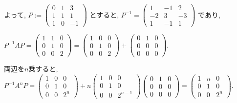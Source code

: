 \documentclass{jsarticle}
\begin{document}
よって, $P := \begin{pmatrix} 0 & 1 & 3 \\ 1 & 1 & 1 \\ 1 & 0 & -1 \end{pmatrix}$ とすると, $P^{-1} = \begin{pmatrix} 1 & -1 & 2 \\ -2 & 3 & -3 \\ 1 & -1 & 1 \end{pmatrix}$ であり, 

$P^{-1}AP = 
\begin{pmatrix} 1 & 1 & 0 \\ 0 & 1 & 0 \\ 0 & 0 & 2 \end{pmatrix} = \begin{pmatrix} 1 & 0 & 0 \\ 0 & 1 & 0 \\ 0 & 0 & 2 \end{pmatrix} + \begin{pmatrix} 0 & 1 & 0 \\ 0 & 0 & 0 \\ 0 & 0 & 0 \end{pmatrix}$.

両辺を$n$乗すると, $P^{-1}A^nP = \begin{pmatrix} 1 & 0 & 0 \\ 0 & 1 & 0 \\ 0 & 0 & 2^n \end{pmatrix} + n\begin{pmatrix} 1 & 0 & 0 \\ 0 & 1 & 0 \\ 0 & 0 & 2^{n-1} \end{pmatrix}\begin{pmatrix} 0 & 1 & 0 \\ 0 & 0 & 0 \\ 0 & 0 & 0 \end{pmatrix}
= \begin{pmatrix} 1 & n & 0 \\ 0 & 1 & 0 \\ 0 & 0 & 2^n \end{pmatrix}$.
\end{document}
